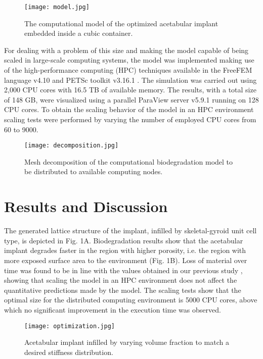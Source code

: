 \begin{figure}[h]
\centering
\medskip
\texttt{[image: model.jpg]}
\caption[Computational biodegradation model for the porous acetabular implant]{The computational model of the optimized acetabular implant embedded inside a cubic container.} \label{fig:cup_model}
\end{figure}

For dealing with a problem of this size and making the model capable of being scaled in large-scale computing systems, the model was implemented making use of the high-performance computing (HPC) techniques available in the FreeFEM language v4.10 and PETSc toolkit v3.16.1 \cite{Barzegari2022}. The simulation was carried out using 2,000 CPU cores with 16.5 TB of available memory. The results, with a total size of 148 GB, were visualized using a parallel ParaView server v5.9.1 running on 128 CPU cores. To obtain the scaling behavior of the model in an HPC environment scaling tests were performed by varying the number of employed CPU cores from 60 to \num{9000}.

\begin{figure}[h]
\centering
\medskip
\texttt{[image: decomposition.jpg]}
\caption[Mesh decomposition of the acetabular implant model]{Mesh decomposition of the computational biodegradation model to be distributed to available computing nodes.} \label{fig:cup_decomposition}
\end{figure}

\section{Results and Discussion}

The generated lattice structure of the implant, infilled by skeletal-gyroid unit cell type, is depicted in Fig. 1A. Biodegradation results show that the acetabular implant degrades faster in the region with higher porosity, i.e. the region with more exposed surface area to the environment (Fig. 1B). Loss of material over time was found to be in line with the values obtained in our previous study \cite{Barzegari2021}, showing that scaling the model in an HPC environment does not affect the quantitative predictions made by the model.  The scaling tests show that the optimal size for the distributed computing environment is \num{5000} CPU cores, above which no significant improvement in the execution time was observed.

\begin{figure}[h]
\centering
\medskip
\texttt{[image: optimization.jpg]}
\caption[Infilled acetabular implant]{Acetabular implant infilled by varying volume fraction to match a desired stiffness distribution.} \label{fig:cup_optimization}
\end{figure}

